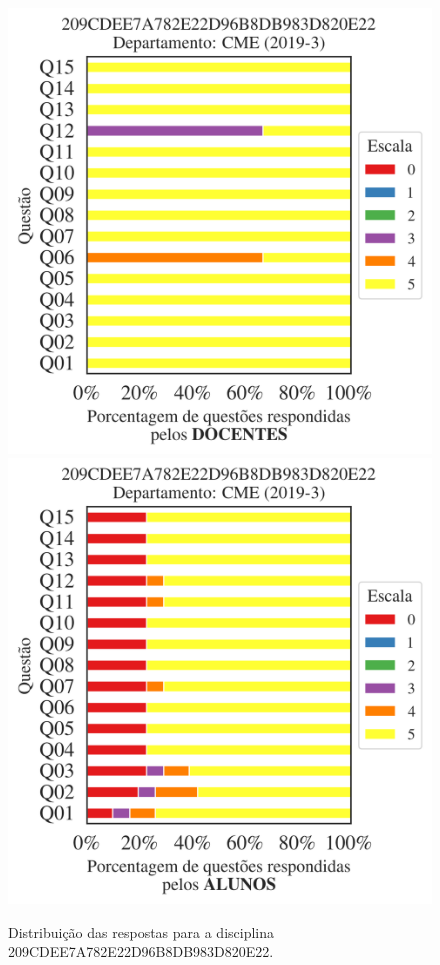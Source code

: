 \documentclass[a4paper,10pt]{article}
\begin{document}
\begin{figure}[h]
\centering
\includegraphics[width=0.485\linewidth]{analise_disciplina_departamento_CME_209CDEE7A782E22D96B8DB983D820E22_docentes.png}
\includegraphics[width=0.485\linewidth]{analise_disciplina_departamento_CME_209CDEE7A782E22D96B8DB983D820E22_alunos.png}
\caption{\label{fig:analise_geral_departamento}                Distribuição das respostas para a disciplina 209CDEE7A782E22D96B8DB983D820E22. }
\end{figure}
\end{document}
